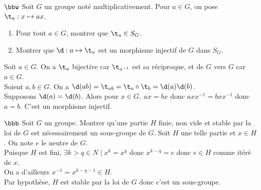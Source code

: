 \documentclass[11pt]{article}
\begin{document}
\begin{exercice}{$\bbw$}{}
    Soit $G$ un groupe noté multiplicativement. Pour $a\in G$, on pose $\t_a:x\mapsto ax$.
    \begin{enumerate}
        \item Pour tout $a\in G$, montrer que $\t_a\in S_G$.
        \item Montrer que $\d:a\mapsto \t_a$ est un morphisme injectif de $G$ dans $S_G$.
    \end{enumerate}
    \tcblower
     Soit $a\in G$. On a $\t_a$ bijective car $\t_{a^{-1}}$ est sa réciproque, et de $G$ vers $G$ car $a\in G$.\\
     Soient $a,b\in G$. On a $\d(ab)=\t_{ab}=\t_{a}\circ\t_{b}=\d(a)\d(b)$.\\
    Supposons $\d(a)=\d(b)$. Alors pour $x\in G, ~ ax=bx$ donc $axx^{-1}=bxx^{-1}$ donc $a=b$. C'est un morphisme injectif.
\end{exercice}

\begin{exercice}{$\bbb$}{}
    Soit $G$ un groupe. Montrer qu'une partie $H$ finie, non vide et stable par la loi de $G$ est nécessairement un sous-groupe de $G$.
    \tcblower
    Soit $H$ une telle partie et $x\in H$. On note $e$ le neutre de $G$.\\
    Puisque $H$ est fini, $\exists k>q\in N \mid x^k=x^q$ donc $x^{k-q}=e$ donc $e\in H$ comme itéré de $x$.\\
    On a d'ailleurs $x^{-1}=x^{k-q-1}\in H$.\\
    Par hypothèse, $H$ est stable par la loi de $G$ donc c'est un sous-groupe.
\end{exercice}
\end{document}
